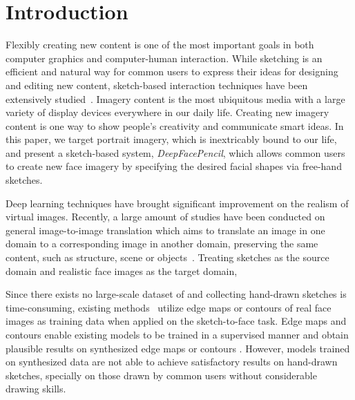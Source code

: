 
\section{Introduction}



Flexibly creating new content is one of the most important goals in both computer graphics and computer-human interaction. While sketching is an efficient and natural way for common users to express their ideas for designing and editing new content, sketch-based interaction techniques have been extensively studied~\cite{SutherlandSketchPad64,Zeleznik-Sketch96,Igarashi-teddy99,Chen_sketchingreality08,Chen09sketch2photo}. 
Imagery content is the most ubiquitous media with a large variety of display devices everywhere in our daily life. 
Creating new imagery content is one way to show people's creativity and communicate smart ideas.
%
In this paper, we target portrait imagery, which is inextricably bound to our life, and present a sketch-based system, \emph{DeepFacePencil}, which allows common users to create new face imagery by specifying the desired facial shapes via free-hand sketches. 

Deep learning techniques have brought significant improvement on the realism of virtual images. 
Recently, a large amount of studies have been conducted on general image-to-image translation which aims to translate an image in one domain to a corresponding image in another domain, preserving the same content, such as structure, scene or objects~\cite{pix2pix,pix2pixHD,CycleGANs,DualGAN, DiscoGANs, DualGANs,BicycleGANs}. 
%
Treating sketches as the source domain and realistic face images as the target domain, 

Since there exists no large-scale dataset of  and collecting hand-drawn sketches is time-consuming, existing methods~\cite{pix2pix, pix2pixHD, Lines2Face} utilize edge maps or contours of real face images as training data when applied on the sketch-to-face task. Edge maps and contours enable existing models to be trained in a supervised manner and obtain plausible results on synthesized edge maps or contours . 
%
However, models trained on synthesized data are not able to achieve satisfactory results on hand-drawn sketches, specially on those drawn by common users without considerable drawing skills. 


